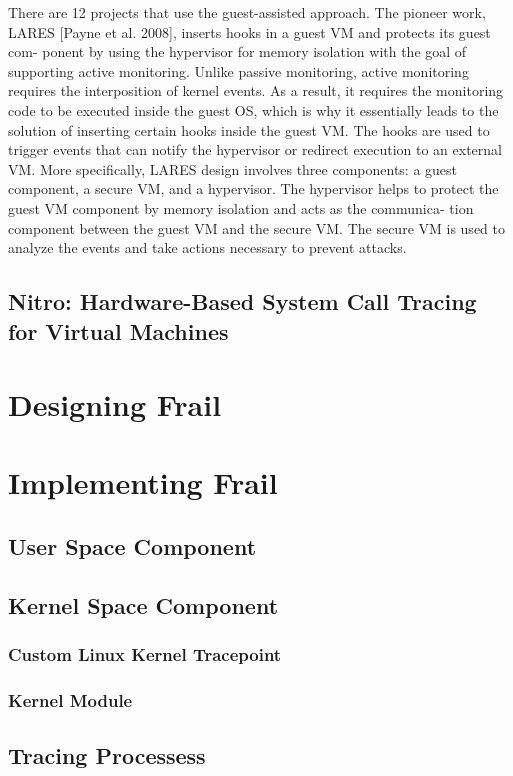 \documentclass{report}
\begin{document}
\begin{spacing}{1.5}
{There are 12 projects that use the guest-assisted approach. The pioneer
work, LARES [Payne et al. 2008], inserts hooks in a guest VM and protects its guest com-
ponent by using the hypervisor for memory isolation with the goal of supporting active
monitoring. Unlike passive monitoring, active monitoring requires the interposition of kernel events. As a result, it requires the monitoring code to be executed inside the guest OS, which is why it essentially leads to the solution of inserting certain hooks inside the guest VM. The hooks are used to trigger events that can notify the hypervisor
or redirect execution to an external VM. More specifically, LARES design involves three
components: a guest component, a secure VM, and a hypervisor. The hypervisor helps
to protect the guest VM component by memory isolation and acts as the communica-
tion component between the guest VM and the secure VM. The secure VM is used to
analyze the events and take actions necessary to prevent attacks.


}

\section{Nitro: Hardware-Based System Call Tracing for Virtual Machines}

\chapter{Designing Frail}
\chapter{Implementing Frail}

\section{User Space Component}
\section{Kernel Space Component}
\subsection{Custom Linux Kernel Tracepoint}
\subsection{Kernel Module}
\section{Tracing Processess}

\end{spacing}
\end{document}
